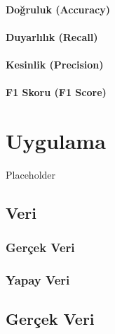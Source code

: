 \documentclass[12pt,twoside]{deuthesis}
\begin{document}
\hypertarget{doux11fruluk-accuracy}{%
\subsubsection{Doğruluk (Accuracy)}\label{doux11fruluk-accuracy}}

\hypertarget{duyarlux131lux131k-recall}{%
\subsubsection{Duyarlılık (Recall)}\label{duyarlux131lux131k-recall}}

\hypertarget{kesinlik-precision}{%
\subsubsection{Kesinlik (Precision)}\label{kesinlik-precision}}

\hypertarget{f1-skoru-f1-score}{%
\subsubsection{F1 Skoru (F1 Score)}\label{f1-skoru-f1-score}}

\hypertarget{Bolum3}{%
\chapter{Uygulama}\label{Bolum3}}

Placeholder

\hypertarget{veri}{%
\section{Veri}\label{veri}}

\hypertarget{geruxe7ek-veri}{%
\subsection{Gerçek Veri}\label{geruxe7ek-veri}}

\hypertarget{yapay-veri}{%
\subsection{Yapay Veri}\label{yapay-veri}}

\hypertarget{geruxe7ek-veri-1}{%
\section{Gerçek Veri}\label{geruxe7ek-veri-1}}
\end{document}
